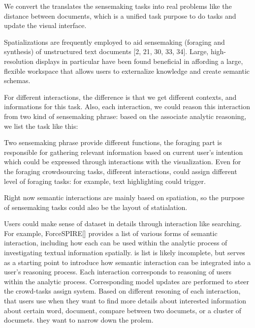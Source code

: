 \documentclass[journal]{vgtc}                %
\begin{document}
We convert the translates the sensemaking tasks into real problems like the distance between documents, which is a unified task purpose to do tasks and update the visual interface.

Spatializations are frequently employed to aid sensemaking (foraging and synthesis) of unstructured text documents [2, 21, 30, 33, 34].
Large, high-resolution displays in particular have been found beneficial in affording a large, flexible workspace that allows users to externalize knowledge and create semantic schemas.

For different interactions, the difference is that we get different contexts, and informations for this task.
Also, each interaction, we could reason this interaction from two kind of sensemaking phrase: based on the associate analytic reasoning, we list the task like this:


Two sensemaking phrase provide different functions, the foraging part is responsible for gathering relevant information based on current user's intention which could be expressed through interactions with the visualization. Even for the foraging crowdsourcing tasks, different interactions, could assign different level of foraging tasks: for example, text highlighting could trigger.


Right now semantic interactions are mainly based on spatiation, so the purpose of sensemaking tasks could also be the layout of statialation.

Users could make sense of dataset in details through interaction like searching.
For example, ForceSPIRE[] provides a list of various forms of semantic interaction, including how each can be used within the analytic process of investigating textual information spatially.
is list is likely incomplete, but serves as a starting point to introduce how semantic interaction can be integrated into a user’s reasoning process.
Each interaction corresponds to reasoning of users within the analytic process.
Corresponding model updates are performed to steer the crowd-tasks assign system.
Based on different resoning of each interaction, that users use when they want to find more details about interested information about certain word, document, compare between two documets, or a cluster of documets.
they want to narrow down the prolem.
\end{document}
